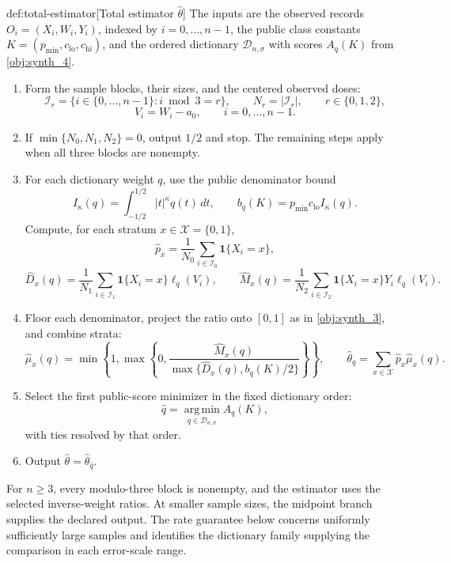 \documentclass[11pt]{article}
\begin{document}
\begin{algorithmv}{def:total-estimator}[Total estimator $\widehat\theta$]
The inputs are the observed records \(O_i=(X_i,W_i,Y_i)\), indexed by \(i=0,\ldots,n-1\), the public class constants \(K=(p_{\min},c_{\mathrm{lo}},c_{\mathrm{hi}})\), and the ordered dictionary \(\mathcal D_{n,\sigma}\) with scores \(A_q(K)\) from \cref{obj:synth_4}.
\begin{enumerate}
\item Form the sample blocks, their sizes, and the centered observed doses:
\[
\mathcal I_r
=\{i\in\{0,\ldots,n-1\}:i\bmod3=r\},
\qquad
N_r=|\mathcal I_r|,
\qquad r\in\{0,1,2\},
\]
\[
V_i=W_i-a_0,\qquad i=0,\ldots,n-1.
\]
\item If \(\min\{N_0,N_1,N_2\}=0\), output \(1/2\) and stop. The remaining steps apply when all three blocks are nonempty.
\item For each dictionary weight \(q\), use the public denominator bound
\[
I_\kappa(q)=\int_{-1/2}^{1/2}|t|^\kappa q(t)\,dt,
\qquad
b_q(K)=p_{\min}c_{\mathrm{lo}}I_\kappa(q).
\]
Compute, for each stratum \(x\in\mathcal X=\{0,1\}\),
\[
\widehat p_x
=\frac1{N_0}\sum_{i\in\mathcal I_0}\mathbf1\{X_i=x\},
\]
\[
\widehat D_x(q)
=\frac1{N_1}\sum_{i\in\mathcal I_1}
\mathbf1\{X_i=x\}\ell_q(V_i),
\qquad
\widehat M_x(q)
=\frac1{N_2}\sum_{i\in\mathcal I_2}
\mathbf1\{X_i=x\}Y_i\ell_q(V_i).
\]
\item Floor each denominator, project the ratio onto \([0,1]\) as in \cref{obj:synth_3}, and combine strata:
\[
\widehat\mu_x(q)
=\min\left\{1,\max\left\{0,
\frac{\widehat M_x(q)}
{\max\{\widehat D_x(q),b_q(K)/2\}}
\right\}\right\},
\qquad
\widehat\theta_q
=\sum_{x\in\mathcal X}\widehat p_x\widehat\mu_x(q).
\]
\item Select the first public-score minimizer in the fixed dictionary order:
\[
\widehat q
=\operatorname*{arg\,min}_{q\in\mathcal D_{n,\sigma}}A_q(K),
\]
with ties resolved by that order.
\item Output \(\widehat\theta=\widehat\theta_{\widehat q}\).
\end{enumerate}
\end{algorithmv}

For \(n\ge3\), every modulo-three block is nonempty, and the estimator uses the selected inverse-weight ratios. At smaller sample sizes, the midpoint branch supplies the declared output. The rate guarantee below concerns uniformly sufficiently large samples and identifies the dictionary family supplying the comparison in each error-scale range.
\end{document}
